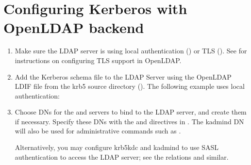 \documentclass[letterpaper,10pt,english]{sphinxmanual}
\begin{document}
\chapter{Configuring Kerberos with OpenLDAP back\sphinxhyphen{}end}
\label{\detokenize{admin/conf_ldap:configuring-kerberos-with-openldap-back-end}}\label{\detokenize{admin/conf_ldap:conf-ldap}}\label{\detokenize{admin/conf_ldap::doc}}\begin{enumerate}
%
\item {} 
\sphinxAtStartPar
Make sure the LDAP server is using local authentication
() or TLS ().  See
 for instructions on
configuring TLS support in OpenLDAP.

\item {} 
\sphinxAtStartPar
Add the Kerberos schema file to the LDAP Server using the OpenLDAP
LDIF file from the krb5 source directory
().
The following example uses local authentication:

\begin{sphinxVerbatim}[commandchars=\\\{\}]
      
\end{sphinxVerbatim}

\item {} 
\sphinxAtStartPar
Choose DNs for the {\hyperref[\detokenize{admin/admin_commands/krb5kdc:krb5kdc-8}]{}} and {\hyperref[\detokenize{admin/admin_commands/kadmind:kadmind-8}]{}} servers
to bind to the LDAP server, and create them if necessary.  Specify
these DNs with the  and 
directives in {\hyperref[\detokenize{admin/conf_files/kdc_conf:kdc-conf-5}]{}}.  The kadmind DN will also be
used for administrative commands such as {\hyperref[\detokenize{admin/admin_commands/kdb5_util:kdb5-util-8}]{}}.

\sphinxAtStartPar
Alternatively, you may configure krb5kdc and kadmind to use SASL
authentication to access the LDAP server; see the {\hyperref[\detokenize{admin/conf_files/kdc_conf:dbmodules}]{}}
relations  and similar.


\end{enumerate}
\end{document}
